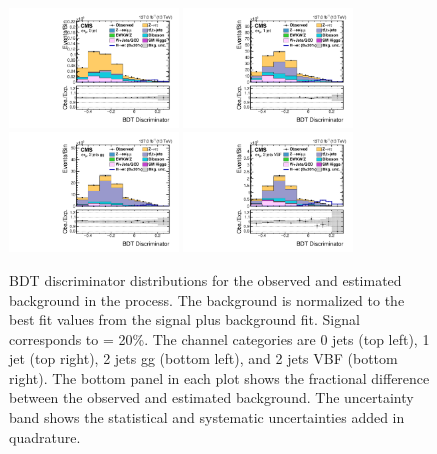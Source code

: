 \begin{figure}[htbp!]
  \centering
  \includegraphics[width=0.4\textwidth]{plots/chapter9/BDT/emu/0jet.pdf}
  \includegraphics[width=0.4\textwidth]{plots/chapter9/BDT/emu/1jet.pdf} \\
  \includegraphics[width=0.4\textwidth]{plots/chapter9/BDT/emu/2jet_gg.pdf}
  \includegraphics[width=0.4\textwidth]{plots/chapter9/BDT/emu/2jet_vbf.pdf} \\
  \caption{BDT discriminator distributions for the observed and estimated background in the \emu process. The background is normalized to the best fit values from the signal plus background fit. Signal corresponds to \BHet = 20\%. The \emu channel categories are 0 jets (top left), 1 jet (top right), 2 jets gg (bottom left), and 2 jets VBF (bottom right). The bottom panel in each plot shows the fractional difference between the observed and estimated background. The uncertainty band shows the statistical and systematic uncertainties added in quadrature.}
  \label{fig:bdt_emu}
\end{figure}

